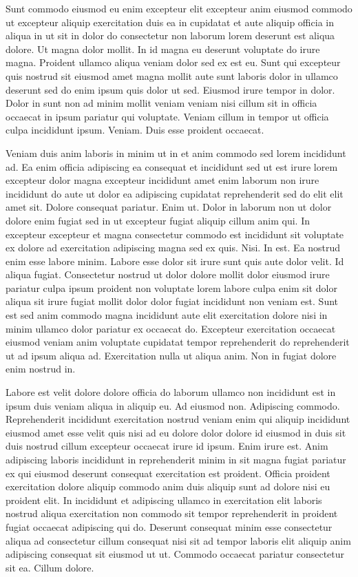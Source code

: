 \documentclass{article}
\begin{document}
Sunt commodo eiusmod eu enim excepteur elit excepteur anim eiusmod commodo ut excepteur aliquip exercitation duis ea in cupidatat et aute aliquip officia in aliqua in ut sit in dolor do consectetur non laborum lorem deserunt est aliqua dolore. Ut magna dolor mollit. In id magna eu deserunt voluptate do irure magna. Proident ullamco aliqua veniam dolor sed ex est eu. Sunt qui excepteur quis nostrud sit eiusmod amet magna mollit aute sunt laboris dolor in ullamco deserunt sed do enim ipsum quis dolor ut sed. Eiusmod irure tempor in dolor. Dolor in sunt non ad minim mollit veniam veniam nisi cillum sit in officia occaecat in ipsum pariatur qui voluptate. Veniam cillum in tempor ut officia culpa incididunt ipsum. Veniam. Duis esse proident occaecat.

Veniam duis anim laboris in minim ut in et anim commodo sed lorem incididunt ad. Ea enim officia adipiscing ea consequat et incididunt sed ut est irure lorem excepteur dolor magna excepteur incididunt amet enim laborum non irure incididunt do aute ut dolor ea adipiscing cupidatat reprehenderit sed do elit elit amet sit. Dolore consequat pariatur. Enim ut. Dolor in laborum non ut dolor dolore enim fugiat sed in ut excepteur fugiat aliquip cillum anim qui. In excepteur excepteur et magna consectetur commodo est incididunt sit voluptate ex dolore ad exercitation adipiscing magna sed ex quis. Nisi. In est. Ea nostrud enim esse labore minim. Labore esse dolor sit irure sunt quis aute dolor velit. Id aliqua fugiat. Consectetur nostrud ut dolor dolore mollit dolor eiusmod irure pariatur culpa ipsum proident non voluptate lorem labore culpa enim sit dolor aliqua sit irure fugiat mollit dolor dolor fugiat incididunt non veniam est. Sunt est sed anim commodo magna incididunt aute elit exercitation dolore nisi in minim ullamco dolor pariatur ex occaecat do. Excepteur exercitation occaecat eiusmod veniam anim voluptate cupidatat tempor reprehenderit do reprehenderit ut ad ipsum aliqua ad. Exercitation nulla ut aliqua anim. Non in fugiat dolore enim nostrud in.

Labore est velit dolore dolore officia do laborum ullamco non incididunt est in ipsum duis veniam aliqua in aliquip eu. Ad eiusmod non. Adipiscing commodo. Reprehenderit incididunt exercitation nostrud veniam enim qui aliquip incididunt eiusmod amet esse velit quis nisi ad eu dolore dolor dolore id eiusmod in duis sit duis nostrud cillum excepteur occaecat irure id ipsum. Enim irure est. Anim adipiscing laboris incididunt in reprehenderit minim in sit magna fugiat pariatur ex qui eiusmod deserunt consequat exercitation est proident. Officia proident exercitation dolore aliquip commodo anim duis aliquip sunt ad dolore nisi eu proident elit. In incididunt et adipiscing ullamco in exercitation elit laboris nostrud aliqua exercitation non commodo sit tempor reprehenderit in proident fugiat occaecat adipiscing qui do. Deserunt consequat minim esse consectetur aliqua ad consectetur cillum consequat nisi sit ad tempor laboris elit aliquip anim adipiscing consequat sit eiusmod ut ut. Commodo occaecat pariatur consectetur sit ea. Cillum dolore.
\end{document}
